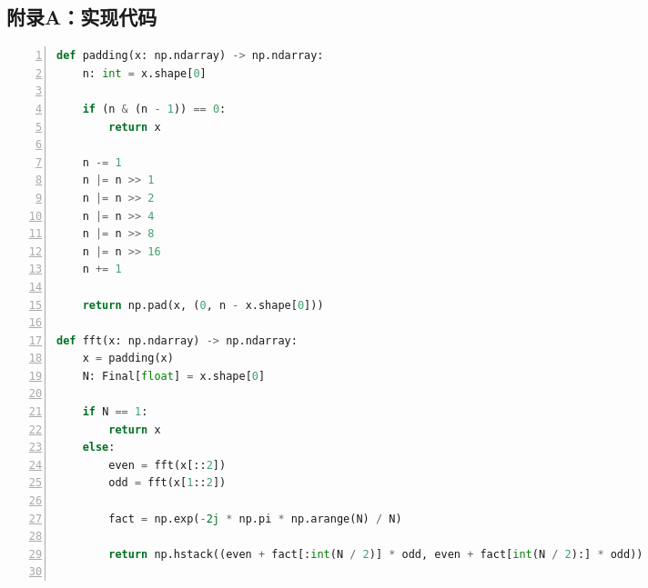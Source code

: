 \documentclass[a4paper,twoside]{article}
\begin{document}
\begin{spacing}{1.2}
\clearpage

\appendix
\section{附录A：实现代码}
\label{sec:app}

\begin{lstlisting}[language=Python,numbers=left,style=PythonStyle,label={code:fft_rec},caption=FFT实现]
def padding(x: np.ndarray) -> np.ndarray:
    n: int = x.shape[0]

    if (n & (n - 1)) == 0:
        return x

    n -= 1
    n |= n >> 1
    n |= n >> 2
    n |= n >> 4
    n |= n >> 8
    n |= n >> 16
    n += 1

    return np.pad(x, (0, n - x.shape[0]))

def fft(x: np.ndarray) -> np.ndarray:
    x = padding(x)
    N: Final[float] = x.shape[0]

    if N == 1:
        return x
    else:
        even = fft(x[::2])
        odd = fft(x[1::2])

        fact = np.exp(-2j * np.pi * np.arange(N) / N)

        return np.hstack((even + fact[:int(N / 2)] * odd, even + fact[int(N / 2):] * odd))


\end{lstlisting}

\end{spacing}
\end{document}
